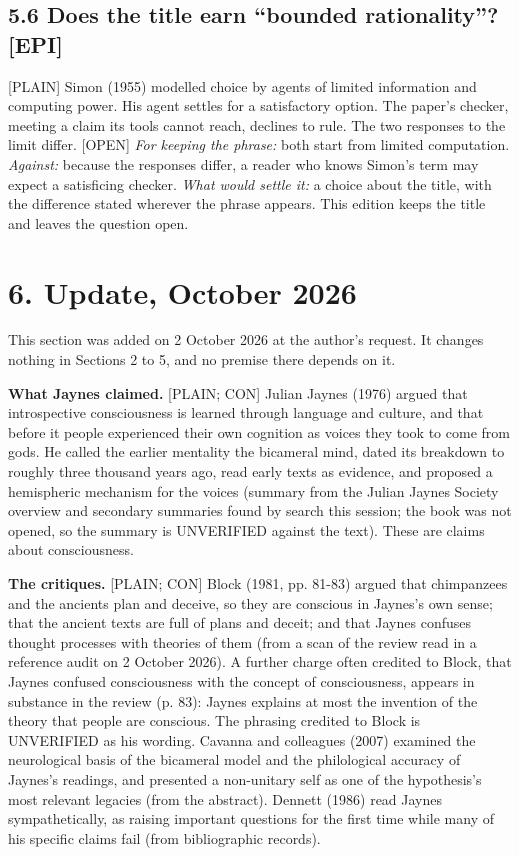 \documentclass[11pt]{article}
\newcommand{\register}[1]{{\ttfamily\small #1}}
\begin{document}
\subsection*{5.6 Does the title earn ``bounded rationality''? [EPI]}

\register{[PLAIN]} Simon (1955) modelled choice by agents of limited information and computing power. His agent settles for a satisfactory option. The paper's checker, meeting a claim its tools cannot reach, declines to rule. The two responses to the limit differ. \register{[OPEN]} \emph{For keeping the phrase:} both start from limited computation. \emph{Against:} because the responses differ, a reader who knows Simon's term may expect a satisficing checker. \emph{What would settle it:} a choice about the title, with the difference stated wherever the phrase appears. This edition keeps the title and leaves the question open.

\section*{6. Update, October 2026}

This section was added on 2 October 2026 at the author's request. It changes nothing in Sections 2 to 5, and no premise there depends on it.

\textbf{What Jaynes claimed.} \register{[PLAIN; CON]} Julian Jaynes (1976) argued that introspective consciousness is learned through language and culture, and that before it people experienced their own cognition as voices they took to come from gods. He called the earlier mentality the bicameral mind, dated its breakdown to roughly three thousand years ago, read early texts as evidence, and proposed a hemispheric mechanism for the voices (summary from the Julian Jaynes Society overview and secondary summaries found by search this session; the book was not opened, so the summary is UNVERIFIED against the text). These are claims about consciousness.

\textbf{The critiques.} \register{[PLAIN; CON]} Block (1981, pp. 81-83) argued that chimpanzees and the ancients plan and deceive, so they are conscious in Jaynes's own sense; that the ancient texts are full of plans and deceit; and that Jaynes confuses thought processes with theories of them (from a scan of the review read in a reference audit on 2 October 2026). A further charge often credited to Block, that Jaynes confused consciousness with the concept of consciousness, appears in substance in the review (p. 83): Jaynes explains at most the invention of the theory that people are conscious. The phrasing credited to Block is UNVERIFIED as his wording. Cavanna and colleagues (2007) examined the neurological basis of the bicameral model and the philological accuracy of Jaynes's readings, and presented a non-unitary self as one of the hypothesis's most relevant legacies (from the abstract). Dennett (1986) read Jaynes sympathetically, as raising important questions for the first time while many of his specific claims fail (from bibliographic records).
\end{document}

